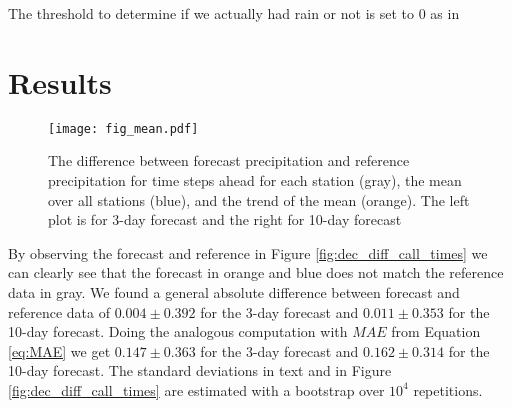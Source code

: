 \documentclass{article}
\theoremstyle{plain}
\theoremstyle{definition}
\theoremstyle{remark}
\begin{document}
The threshold to determine if we actually had rain or not is set to $0$ as in
\cite{Forecast_quaility_DWD}  %




\section{Results}\label{sec:results}
\begin{figure}
    \centering
    \texttt{[image: fig\_mean.pdf]}
    \caption{The difference between forecast precipitation and reference
        precipitation for time steps ahead for each station (gray), the mean over all
        stations (blue), and the trend of the mean (orange). The left plot is for 3-day
        forecast and the right for 10-day forecast}
    \label{fig:mean_trend}
\end{figure}
By observing the forecast and reference in Figure \ref{fig:dec_diff_call_times}
we can clearly see that the forecast in orange and blue does not match the
reference data in gray. We found a general absolute difference between forecast
and reference data of $0.004 \pm 0.392$ for the 3-day forecast and $0.011 \pm
    0.353$ for the 10-day forecast. Doing the analogous computation with $MAE$ from
Equation \ref{eq:MAE} we get $0.147 \pm 0.363$ for the 3-day forecast and
$0.162 \pm 0.314$ for the 10-day forecast. The standard deviations in text and
in Figure \ref{fig:dec_diff_call_times} are estimated with a bootstrap over
$10^4$ repetitions. \\
\end{document}
